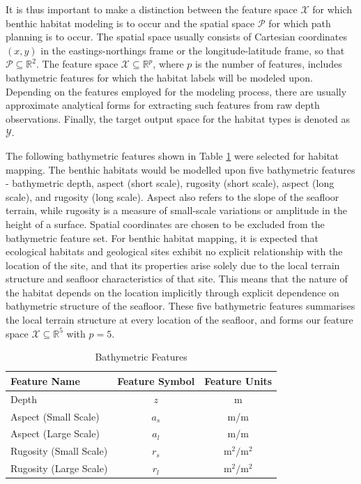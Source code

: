 		It is thus important to make a distinction between the feature space $\mathcal{X}$ for which benthic habitat modeling is to occur and the spatial space $\mathcal{P}$ for which path planning is to occur. The spatial space usually consists of Cartesian coordinates $(x, y)$ in the eastings-northings frame or the longitude-latitude frame, so that $\mathcal{P} \subseteq \mathbb{R}^{2}$. The feature space $\mathcal{X} \subseteq \mathbb{R}^{p}$, where $p$ is the number of features, includes bathymetric features for which the habitat labels will be modeled upon. Depending on the features employed for the modeling process, there are usually approximate analytical forms for extracting such features from raw depth observations. Finally, the target output space for the habitat types is denoted as $\mathcal{Y}$.
		
		The following bathymetric features shown in Table \ref{Table:BathymetricFeatures} were selected for habitat mapping. The benthic habitats would be modelled upon five bathymetric features - bathymetric depth, aspect (short scale), rugosity (short scale), aspect (long scale), and rugosity (long scale). Aspect also refers to the slope of the seafloor terrain, while rugosity is a measure of small-scale variations or amplitude in the height of a surface. Spatial coordinates are chosen to be excluded from the bathymetric feature set. For benthic habitat mapping, it is expected that ecological habitats and geological sites exhibit no explicit relationship with the location of the site, and that its properties arise solely due to the local terrain structure and seafloor characteristics  of that site. This means that the nature of the habitat depends on the location implicitly through explicit dependence on bathymetric structure of the seafloor. These five bathymetric features summarises the local terrain structure at every location of the seafloor, and forms our feature space $\mathcal{X} \subseteq \mathbb{R}^{5}$ with $p = 5$. 
		
		\begin{table}[h]
			\begin{center}
				\begin{tabular}{ l c c }
					\hline
					\hline
					Feature Name & Feature Symbol & Feature Units \\
					\hline
					\hline
					Depth & $z$ & m \\
					Aspect (Small Scale) & $a_{s}$ & m/m \\
					Aspect (Large Scale) & $a_{l}$& m/m \\
					Rugosity (Small Scale) & $r_{s}$ & $\mathrm{m^{2}/m^{2}}$ \\
					Rugosity (Large Scale) & $r_{l}$ & $\mathrm{m^{2}/m^{2}}$  \\
					\hline
					\hline
				\end{tabular}
			\end{center}
	  	\caption{Bathymetric Features}
	  	\label{Table:BathymetricFeatures}			
	  	\end{table}	
		
